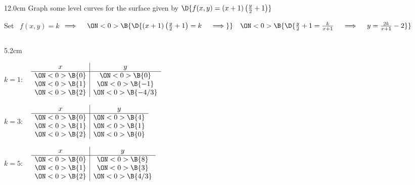 \begin{frame}
\frametitle{}
\scriptsize
\begin{columns}
\begin{column}{12.0cm}
\EX Graph some level curves for the surface given by \quad $\D{f(x,y) = (x+1)\left(\frac{y}{2}+1\right)}$

\vspace{0.5cm}

Set \, $f(x,y) = k$ \quad $\implies \quad 
\ON<0>{\B{\D{(x+1)\left(\frac{y}{2}+1\right) = k \quad \implies}}} \quad 
\ON<0>{\B{\D{\frac{y}{2}+1 = \frac{k}{x+1} \quad \implies \quad y = \frac{2k}{x+1} - 2}}}$ 

\vspace{0.5cm}

\begin{columns}
\begin{column}{5.2cm}

$k=1$: \,\,\, 
$
\begin{array}{c|c}
	x&y \\
	\hline
	\ON<0>{\B{0}}&\ON<0>{\B{0}} \\
	\ON<0>{\B{1}}&\ON<0>{\B{-1}} \\
	\ON<0>{\B{2}}&\ON<0>{\B{-4/3}} \\
\end{array}
$

\vspace{0.5cm}


$k=3$: \,\,\, 
$
\begin{array}{c|c}
	x&y \\
	\hline
	\ON<0>{\B{0}}&\ON<0>{\B{4}} \\
	\ON<0>{\B{1}}&\ON<0>{\B{1}} \\
	\ON<0>{\B{2}}&\ON<0>{\B{0}} \\
\end{array}
$

\vspace{0.5cm}

$k=5$: \,\,\, 
$
\begin{array}{c|c}
	x&y \\
	\hline
	\ON<0>{\B{0}}&\ON<0>{\B{8}} \\
	\ON<0>{\B{1}}&\ON<0>{\B{3}} \\
	\ON<0>{\B{2}}&\ON<0>{\B{4/3}} \\
\end{array}
$


\end{column}
\end{columns}
\end{column}
\end{columns}
\end{frame}

